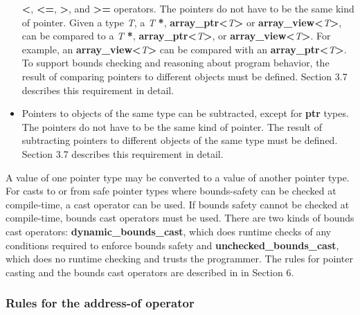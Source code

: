 \documentclass[]{article}
\begin{document}
\begin{itemize}
  \textbf{\textless{}}, \textbf{\textless{}=}, \textbf{\textgreater{}},
  and \textbf{\textgreater{}=} operators. The pointers do not have to be
  the same kind of pointer. Given a type \emph{T}, a \emph{T}
  \textbf{*},
  \textbf{array\_ptr\textless{}}\emph{T}\textbf{\textgreater{}} or
  \textbf{array\_view\textless{}}\emph{T}\textbf{\textgreater{}}, can be
  compared to a \emph{T} \textbf{*},
  \textbf{array\_ptr\textless{}}\emph{T}\textbf{\textgreater{}}, or
  \textbf{array\_view\textless{}}\emph{T}\textbf{\textgreater{}}. For
  example, an
  \textbf{array\_view\textless{}}\emph{T}\textbf{\textgreater{}} can be
  compared with an
  \textbf{array\_ptr\textless{}}\emph{T}\textbf{\textgreater{}}. To
  support bounds checking and reasoning about program behavior, the
  result of comparing pointers to different objects must be defined.
  Section 3.7 describes this requirement in detail.
\item
  Pointers to objects of the same type can be subtracted, except for
  \textbf{ptr} types. The pointers do not have to be the same kind of
  pointer. The result of subtracting pointers to different objects of
  the same type must be defined. Section 3.7 describes this requirement
  in detail.
\end{itemize}

A value of one pointer type may be converted to a value of another
pointer type. For casts to or from safe pointer types where
bounds-safety can be checked at compile-time, a cast operator can be
used. If bounds safety cannot be checked at compile-time, bounds cast
operators must be used. There are two kinds of bounds cast operators:
\textbf{dynamic\_bounds\_cast}, which does runtime checks of any
conditions required to enforce bounds safety and
\textbf{unchecked\_bounds\_cast}, which does no runtime checking and
trusts the programmer. The rules for pointer casting and the bounds cast
operators are described in in Section
6\protect\hypertarget{ux5fToc422906959}{}{\protect\hypertarget{ux5fToc424307683}{}{\protect\hypertarget{ux5fToc426641061}{}{\protect\hypertarget{ux5fToc435434921}{}{\protect\hypertarget{ux5fToc437460742}{}{}}}}}.

\subsubsection{\texorpdfstring{\protect\hypertarget{ux5fToc440445414}{}{\protect\hypertarget{ux5fToc440449196}{}{\protect\hypertarget{ux5fToc440551846}{}{}}}Rules
for the address-of
operator}{Rules for the address-of operator}}\label{rules-for-the-address-of-operator}
\end{document}
